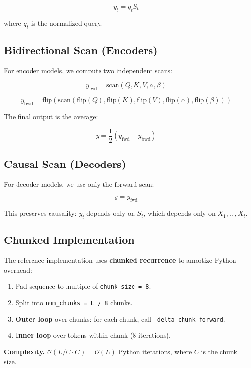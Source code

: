 \[
y_t = q_t S_t
\tag{4.4}
\]

where $q_t$ is the normalized query.

\subsection{Bidirectional Scan (Encoders)}

For encoder models, we compute two independent scans:

\[
y_\text{fwd} = \text{scan}(Q, K, V, \alpha, \beta)
\tag{4.5}
\]

\[
y_\text{bwd} = \text{flip}(\text{scan}(\text{flip}(Q), \text{flip}(K), \text{flip}(V), 
\text{flip}(\alpha), \text{flip}(\beta)))
\tag{4.6}
\]

The final output is the average:

\[
y = \frac{1}{2}(y_\text{fwd} + y_\text{bwd})
\tag{4.7}
\]

\subsection{Causal Scan (Decoders)}

For decoder models, we use only the forward scan:

\[
y = y_\text{fwd}
\tag{4.8}
\]

This preserves causality: $y_t$ depends only on $S_t$, which depends only 
on $X_1, \dots, X_t$.

\subsection{Chunked Implementation}

The reference implementation uses \textbf{chunked recurrence} to amortize Python 
overhead:

\begin{enumerate}
\item Pad sequence to multiple of \texttt{chunk\_size = 8}.
\item Split into \texttt{num\_chunks = L / 8} chunks.
\item \textbf{Outer loop} over chunks: for each chunk, call \texttt{\_delta\_chunk\_forward}.
\item \textbf{Inner loop} over tokens within chunk (8 iterations).

\end{enumerate}
\textbf{Complexity.} $\mathcal{O}(L / C \cdot C) = \mathcal{O}(L)$ Python 
iterations, where $C$ is the chunk size.

